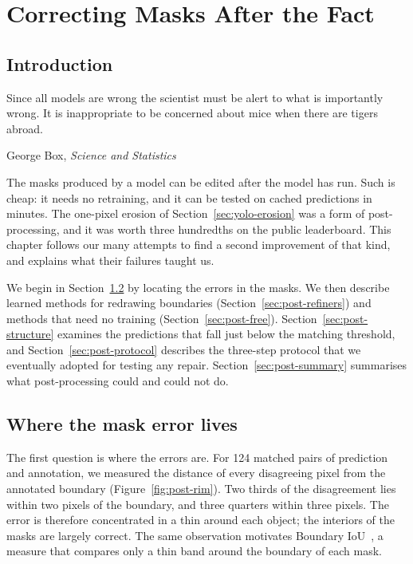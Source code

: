 \chapter{Correcting Masks After the Fact}\label{ch:post}

\section{Introduction}\label{sec:post-intro}
\epigraph{Since all models are wrong the scientist must be alert to what is importantly wrong. It is
inappropriate to be concerned about mice when there are tigers abroad.}{George Box, \emph{Science
and Statistics} \citeyearpar{box1976}}

The masks produced by a model can be edited after the model has run. Such
 is cheap: it needs no retraining, and it can be tested on cached predictions
in minutes. The one-pixel erosion of Section~\ref{sec:yolo-erosion} was a form of post-processing,
and it was worth three hundredths on the public leaderboard. This chapter follows our many attempts
to find a second improvement of that kind, and explains what their failures taught us.

We begin in Section~\ref{sec:post-rim} by locating the errors in the masks. We then describe learned
methods for redrawing boundaries (Section~\ref{sec:post-refiners}) and methods that need no training
(Section~\ref{sec:post-free}). Section~\ref{sec:post-structure} examines the predictions that fall
just below the matching threshold, and Section~\ref{sec:post-protocol} describes the three-step
protocol that we eventually adopted for testing any repair. Section~\ref{sec:post-summary}
summarises what post-processing could and could not do.

\section{Where the mask error lives}\label{sec:post-rim}
The first question is where the errors are. For 124 matched pairs of prediction and annotation, we
measured the distance of every disagreeing pixel from the annotated boundary
(Figure~\ref{fig:post-rim}). Two thirds of the disagreement lies within two pixels of the boundary,
and three quarters within three pixels. The error is therefore concentrated in a thin
 around each object; the interiors of the masks are largely correct. The same
observation motivates Boundary IoU~\citep{cheng2021boundaryiou}, a measure that compares only a thin
band around the boundary of each mask.

